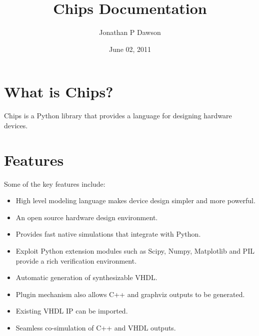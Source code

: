 \documentclass[letterpaper,10pt,english]{sphinxmanual}
\title{Chips Documentation}
\date{June 02, 2011}
\author{Jonathan P Dawson}
\begin{document}
\maketitle
\tableofcontents
{}\label{index::doc}



\chapter{What is Chips?}
\label{index:chips-hardware-design-in-python}\label{index:what-is-chips}
Chips is a Python library that provides a language for designing hardware
devices.


\chapter{Features}
\label{index:features}
Some of the key features include:
\begin{itemize}
\item {} 
High level modeling language makes device design simpler and more
powerful.

\item {} 
An open source hardware design environment.

\item {} 
Provides fast native simulations that integrate with Python.

\item {} 
Exploit Python extension modules such as Scipy, Numpy, Matplotlib and PIL
provide a rich verification environment.

\item {} 
Automatic generation of synthesizable VHDL.

\item {} 
Plugin mechanism also allows C++ and graphviz outputs to be generated.

\item {} 
Existing VHDL IP can be imported.

\item {} 
Seamless co-simulation of C++ and VHDL outputs.

\end{itemize}
\end{document}
